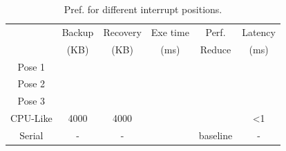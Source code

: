 \begin{table}[t]
  \small
  \centering
  \caption{Pref. for different interrupt positions.}
\begin{tabular}{|c|c|c|c|c|c|}
  \hline
        & Backup  & Recovery & Exe time & Perf. & Latency \bigstrut[t]\\
        & (KB)  & (KB)  & (ms)  & Reduce & (ms) \bigstrut[b]\\
  \hline
  Pose 1 &       &       &       &       &  \bigstrut\\
  \hline
  Pose 2 &       &       &       &       &  \bigstrut\\
  \hline
  Pose 3 &       &       &       &       &  \bigstrut\\
  \hline
  CPU-Like & 4000  & 4000  &       &       & <1 \bigstrut\\
  \hline
  Serial & -     & -     &       &  baseline & - \bigstrut\\
  \hline
  \end{tabular}%
  
  
  \label{tab:anywhere}%
\end{table}%



